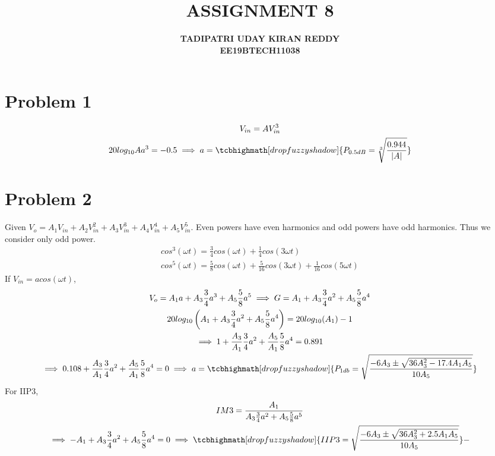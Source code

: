 \documentclass{article}
\begin{document}
\title{{\textbf{ASSIGNMENT 8}}}
\author{\textbf{TADIPATRI UDAY KIRAN REDDY}\\\textbf{EE19BTECH11038}}
\maketitle

\section*{\hfil Problem 1}
\begin{gather*}
	V_{in} = AV_{in}^3\\
	20log_{10}Aa^3 = -0.5 \implies a = \tcbhighmath[drop fuzzy shadow]{P_{0.5dB} = \sqrt[3]{\frac{0.944}{|A|}}}
\end{gather*}

\section*{\hfil Problem 2}
Given $V_o = A_1V_{in} + A_2V_{in}^2 + A_3V_{in}^3 + A_4V_{in}^4 + A_5V_{in}^5$. Even powers have even harmonics and odd powers have odd harmonics. Thus we consider only odd power.
\begin{gather*}
	cos^3(\omega t) = \frac{3}{4}cos(\omega t) + \frac{1}{4}cos(3\omega t)\\
	cos^5(\omega t) =  \frac{5}{8}cos(\omega t) + \frac{5}{16}cos(3\omega t) + \frac{1}{16}cos(5\omega t)
\end{gather*}
If $V_{in} = acos(\omega t)$,
\begin{gather*}
	V_o = A_1a + A_3\frac{3}{4}a^3 + A_5\frac{5}{8}a^5 \implies G = A_1 + A_3\frac{3}{4}a^2 + A_5\frac{5}{8}a^4\\
	20log_{10}\left(A_1 + A_3\frac{3}{4}a^2 + A_5\frac{5}{8}a^4\right) = 20log_{10}(A_1) - 1\\
	\implies 1 + \frac{A_3}{A_1}\frac{3}{4}a^2 + \frac{A_5}{A_1}\frac{5}{8}a^4 = 0.891\\
	\implies 0.108 + \frac{A_3}{A_1}\frac{3}{4}a^2 + \frac{A_5}{A_1}\frac{5}{8}a^4 = 0
	\implies a = \tcbhighmath[drop fuzzy shadow]{P_{1db} = \sqrt{\frac{-6A_3 \pm \sqrt{36A_3^2 - 17.4A_1A_5}}{10A_5}}}
\end{gather*}
For IIP3,
\begin{gather*}
	IM3 = \frac{A_1}{A_3\frac{3}{4}a^2 + A_5\frac{5}{8}a^5}\\
	\implies -A_1 + A_3\frac{3}{4}a^2 + A_5\frac{5}{8}a^4 = 0 \implies \tcbhighmath[drop fuzzy shadow]{IIP3 = \sqrt{\frac{-6A_3 \pm \sqrt{36A_3^2 + 2.5A_1A_5}}{10A_5}}}-
\end{gather*}
\end{document}
